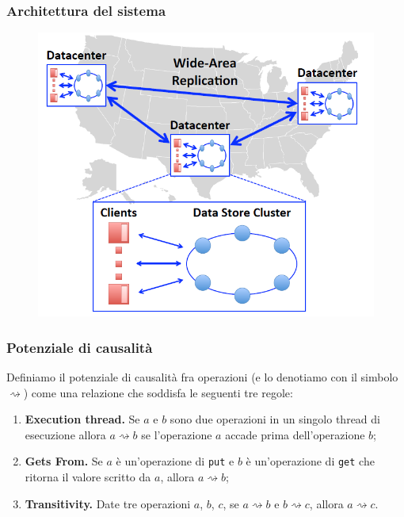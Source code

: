 \begin{frame}
\frametitle{Architettura del sistema}
	\begin{figure}
		\centering
		\includegraphics[scale=0.45]{COPS/COPS1.png}
	\end{figure}
\end{frame}

\begin{frame}
\frametitle{Potenziale di causalità}
	\begin{definizione}
	Definiamo il \alert{potenziale di causalità} fra operazioni (e lo denotiamo con 
	il simbolo $\rightsquigarrow$) come una relazione che soddisfa le seguenti tre regole:
	\begin{enumerate}
		\item<1-> \textbf{Execution thread.}
				  Se $a$ e $b$ sono due operazioni in un singolo thread di esecuzione
				  allora $a \rightsquigarrow b$ se l'operazione $a$ accade prima dell'operazione $b$;
		\item<1-> \textbf{Gets From.}
				  Se $a$ è un'operazione di \texttt{put} e $b$ è un'operazione di
				  \texttt{get} che ritorna il valore scritto da $a$, allora $a \rightsquigarrow b$;
		\item<1-> \textbf{Transitivity.}
				  Date tre operazioni $a$, $b$, $c$, se $a \rightsquigarrow b$ e $b 
				  \rightsquigarrow c$, allora $a \rightsquigarrow c$.
	\end{enumerate}
	\end{definizione}
\end{frame}

